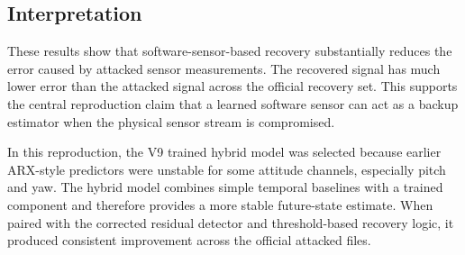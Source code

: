 \subsection{Interpretation}

These results show that software-sensor-based recovery substantially reduces the error caused by attacked sensor measurements. The recovered signal has much lower error than the attacked signal across the official recovery set. This supports the central reproduction claim that a learned software sensor can act as a backup estimator when the physical sensor stream is compromised.

In this reproduction, the V9 trained hybrid model was selected because earlier ARX-style predictors were unstable for some attitude channels, especially pitch and yaw. The hybrid model combines simple temporal baselines with a trained component and therefore provides a more stable future-state estimate. When paired with the corrected residual detector and threshold-based recovery logic, it produced consistent improvement across the official attacked files.
